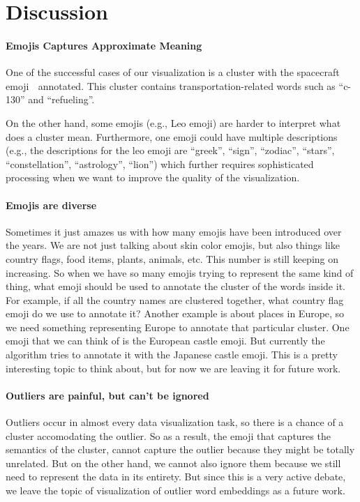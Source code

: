 \section{Discussion}
\label{sec:discussion}

\paragraph{\bf Emojis Captures Approximate Meaning} 
One of the successful cases of our visualization is a cluster with the spacecraft emoji 🚀 annotated. This cluster contains transportation-related words such as ``c-130'' and ``refueling''. 

On the other hand, some emojis (e.g., Leo emoji) are harder to interpret what does a cluster mean. 
Furthermore, one emoji could have multiple descriptions (e.g., the descriptions for the leo emoji are ``greek'', ``sign'', ``zodiac'', ``stars'', ``constellation'', ``astrology'', ``lion'') which further requires sophisticated processing when we want to improve the quality of the visualization. 

\paragraph{\bf Emojis are diverse} 
Sometimes it just amazes us with how many emojis have been introduced over the years. We are not just talking about skin color emojis, but also things like country flags, food items, plants, animals, etc. This number is still keeping on increasing. So when we have so many emojis trying to represent the same kind of thing, what emoji should be used to annotate the cluster of the words inside it. For example, if all the country names are clustered together, what country flag emoji do we use to annotate it? Another example is about places in Europe, so we need something representing Europe to annotate that particular cluster. One emoji that we can think of is the European castle emoji. But currently the algorithm tries to annotate it with the Japanese castle emoji. This is a pretty interesting topic to think about, but for now we are leaving it for future work.

\paragraph{\bf Outliers are painful, but can't be ignored} 
Outliers occur in almost every data visualization task, so there is a chance of a cluster accomodating the outlier. So as a result, the emoji that captures the semantics of the cluster, cannot capture the outlier because they might be totally unrelated. But on the other hand, we cannot also ignore them because we still need to represent the data in its entirety. But since this is a very active debate, we leave the topic of visualization of outlier word embeddings as a future work. 

